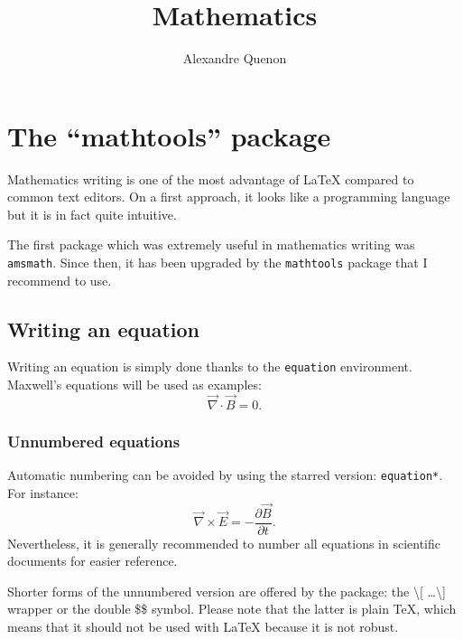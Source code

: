 \documentclass[11pt, a4paper]{report}
\title{Mathematics}
\author{Alexandre Quenon}
\begin{document}
\maketitle

\tableofcontents


\chapter{The \enquote{mathtools} package}

	Mathematics writing is one of the most advantage of \LaTeX{} compared to common text editors.
	On a first approach, it looks like a programming language but it is in fact quite intuitive.
	
	The first package which was extremely useful in mathematics writing was \texttt{amsmath}.
	Since then, it has been upgraded by the \texttt{mathtools} package that I recommend to use.
	
	
	\section{Writing an equation}
	
		Writing an equation is simply done thanks to the \texttt{equation} environment.
		Maxwell's equations will be used as examples:
		\begin{equation}
			\vec{\nabla}\cdot\vec{B}=0.
			\label{eq::Maxwell:no_magnetic_monopole}
		\end{equation}
		
		
		\subsection{Unnumbered equations}
		
			Automatic numbering can be avoided by using the starred version: \texttt{equation*}.
			For instance:
			\begin{equation*}
				\vec{\nabla}\times\vec{E}=-\frac{\partial\vec{B}}{\partial t}.
			\end{equation*}
			Nevertheless, it is generally recommended to number all equations in scientific documents for easier reference.
			
			Shorter forms of the unnumbered version are offered by the package: the \textbackslash [ \ldots \textbackslash ] wrapper or the double \$\$ symbol.
			Please note that the latter is plain \TeX{}, which means that it should not be used with LaTeX because it is not robust.
			
\end{document}

